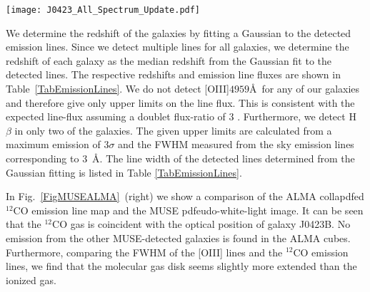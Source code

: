 \documentclass[a4paper,fleqn,usenatbib]{mnras}
\newcommand{\GalA}{J0423A}
\newcommand{\GalB}{J0423B}
\newcommand{\GalD}{J0423D}
\begin{document}
\begin{figure*}
\texttt{[image: J0423\_All\_Spectrum\_Update.pdf]}
\caption{Rest frame optical spectra of the four group members identified from our MUSE observation (offset by an arbitrary number for clarity). The spectra are shifted to rest wavelength using the redshift determined from the emission lines quoted in Table \ref{TabEmissionLines}. The grey area marks the regions possibly contaminated by telluric absorption and emission. The strongest emission line in all spectra is [OII] at $\lambda = 3727$~\AA. The dashed-dotted line marks with increasing wavelength the [OII], H~$\beta$, [OIII]$4959$\AA, and [OIII]$5007$\AA\ emission line. The dotted lines mark the Balmer absorption lines from H~$\gamma$ to H~12 with decreasing wavelength. The dashed lines mark the Ca~H\&K absorption lines. We note, that the features at the [OIII]$4959$\AA\ and H~$\beta$ wavelength in \GalD\ as well as the narrow feature at the [OIII]$4959$\AA\ wavelength in \GalA\ are marginal given the SNR of the spectrum.}
\label{FigFullSpectra}
\end{figure*}




We determine the redshift of the galaxies by fitting a Gaussian to the detected emission lines. Since we detect multiple lines for all galaxies, we determine the redshift of each galaxy as the median redshift from the Gaussian fit to the detected lines. The respective redshifts and emission line fluxes are shown in \mbox{Table \ref{TabEmissionLines}}. We do not detect [OIII]$4959$\AA\ for any of our galaxies and therefore give only upper limits on the line flux. This is consistent with the expected line-flux assuming a doublet flux-ratio of $3$ \mbox{\citep{Storey2000theoretical}}. Furthermore, we detect H~$\beta$ in only two of the galaxies. The given upper limits are calculated from a maximum emission of $3\sigma$ and the FWHM measured from the sky emission lines corresponding to $3$~\AA. The line width of the detected lines determined from the Gaussian fitting is listed in Table \ref{TabEmissionLines}.

In Fig.\ \ref{FigMUSEALMA}~(right) we show a comparison of the ALMA collapdfed $^{12}$CO emission line map and the MUSE pdfeudo-white-light image. It can be seen that the $^{12}$CO gas is coincident with the optical position of galaxy \GalB. No emission from the other MUSE-detected galaxies is found in the ALMA cubes. Furthermore, comparing the FWHM of the [OIII] lines and the $^{12}$CO emission lines, we find that the molecular gas disk seems slightly more extended than the ionized gas.
\end{document}
